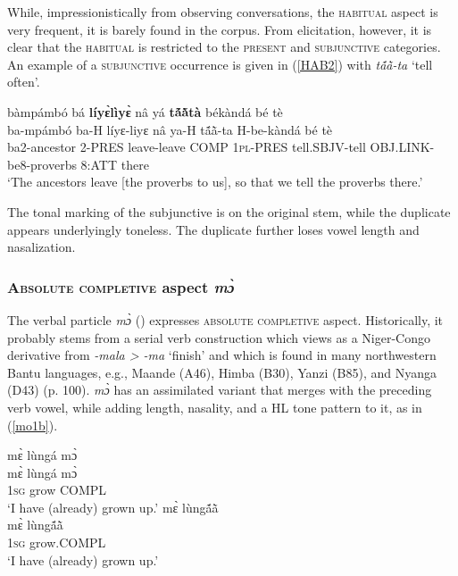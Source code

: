 While, impressionistically from observing conversations, the \textsc{habitual} aspect is very frequent, it is barely found in the corpus. From elicitation, however, it is clear that the \textsc{habitual} is restricted to the \textsc{present} and \textsc{subjunctive} categories. An example of a \textsc{subjunctive} occurrence is given in (\ref{HAB2}) with {\itshape tã́ã̀-ta} `tell often'.


\begin{exe} 
\ex\label{HAB2}
  \glll bàmpámbó bá {\bfseries líyɛ̀lìyɛ̀} nâ yá {\bfseries tã́ã̀tà} békàndá bé tè \\
       ba-mpámbó ba-H líyɛ-liyɛ nâ ya-H tã́ã̀-ta H-be-kàndá bé tè \\
         ba2-ancestor 2-PRES leave-leave COMP 1\textsc{pl}-PRES tell.SBJV-tell OBJ.LINK-be8-proverbs 8:ATT there \\ 
    \trans `The ancestors leave [the proverbs to us], so that we tell the proverbs there.'
\end{exe}

\noindent The tonal marking of the subjunctive is on the original stem, while the duplicate appears underlyingly toneless. The duplicate further loses vowel length and nasalization.









\subsubsection{\textsc{Absolute completive} aspect {\itshape mɔ̀}}
\label{sec:COMPL}

The verbal particle {\itshape mɔ̀} () expresses \textsc{absolute completive} aspect. Historically, it probably stems from a serial verb construction which \citet[67]{nurse08} views as a Niger-Congo derivative from {\itshape -mala > -ma} `finish' and which is found in many northwestern Bantu languages, e.g., Maande (A46), Himba (B30), Yanzi (B85), and Nyanga (D43) (p. 100). {\itshape mɔ̀} has an assimilated variant that merges with the preceding verb vowel, while adding length, nasality, and a HL tone pattern to it, as in (\ref{mo1b}).

\begin{exe} 
\ex\label{mo1}
\begin{xlist} 
\ex\label{mo1a}
  \glll    mɛ̀ lùngá mɔ̀ \\
           mɛ̀ lùngá mɔ̀  \\
             1\textsc{sg}  grow COMPL  \\
    \trans `I have (already) grown up.'
\ex\label{mo1b}
  \glll    mɛ̀ lùngã́ã̀ \\
          mɛ̀ lùngã́ã̀ \\
             1\textsc{sg} grow.COMPL    \\
    \trans `I have (already) grown up.'
\end{xlist}
\end{exe}


